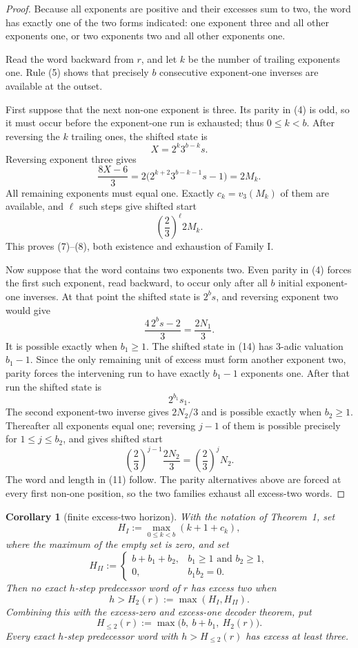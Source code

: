 \documentclass[11pt]{article}
\newtheorem{corollary}[theorem]{Corollary}
\begin{document}
\begin{proof}
Because all exponents are positive and their excesses sum to two, the
word has exactly one of the two forms indicated: one exponent three and
all other exponents one, or two exponents two and all other exponents
one.

Read the word backward from $r$, and let $k$ be the number of trailing
exponents one.  Rule (5) shows that precisely $b$ consecutive
exponent-one inverses are available at the outset.

First suppose that the next non-one exponent is three.  Its parity in
(4) is odd, so it must occur before the exponent-one run is exhausted;
thus $0\leq k<b$.  After reversing the $k$ trailing ones, the shifted
state is
\[
 X=2^k3^{b-k}s.
 \tag{12}
\]
Reversing exponent three gives
\[
 \frac{8X-6}{3}
 =2\bigl(2^{k+2}3^{b-k-1}s-1\bigr)
 =2M_k.
 \tag{13}
\]
All remaining exponents must equal one.  Exactly $c_k=v_3(M_k)$ of
them are available, and $\ell$ such steps give shifted start
\[
 \left(\frac23\right)^\ell2M_k.
\]
This proves (7)--(8), both existence and exhaustion of Family I.

Now suppose that the word contains two exponents two.  Even parity in
(4) forces the first such exponent, read backward, to occur only after
all $b$ initial exponent-one inverses.  At that point the shifted state
is $2^bs$, and reversing exponent two would give
\[
 \frac{4\,2^bs-2}{3}=\frac{2N_1}{3}.
 \tag{14}
\]
It is possible exactly when $b_1\geq1$.  The shifted state in (14) has
$3$-adic valuation $b_1-1$.  Since the only remaining unit of excess
must form another exponent two, parity forces the intervening run to
have exactly $b_1-1$ exponents one.  After that run the shifted state is
\[
 2^{b_1}s_1.
 \tag{15}
\]
The second exponent-two inverse gives $2N_2/3$ and is possible exactly
when $b_2\geq1$.  Thereafter all exponents equal one; reversing $j-1$
of them is possible precisely for $1\leq j\leq b_2$, and gives shifted
start
\[
 \left(\frac23\right)^{j-1}\frac{2N_2}{3}
 =\left(\frac23\right)^jN_2.
 \tag{16}
\]
The word and length in (11) follow.  The parity alternatives above are
forced at every first non-one position, so the two families exhaust all
excess-two words.
\end{proof}

\begin{corollary}[finite excess-two horizon]
With the notation of Theorem~1, set
\[
 H_I:=\max_{0\leq k<b}(k+1+c_k),
 \tag{17}
\]
where the maximum of the empty set is zero, and set
\[
 H_{II}:=
 \begin{cases}
 b+b_1+b_2,&b_1\geq1\text{ and }b_2\geq1,\\
 0,&b_1b_2=0.
 \end{cases}
 \tag{18}
\]
Then no exact $h$-step predecessor word of $r$ has excess two when
\[
 \boxed{h>H_2(r):=\max(H_I,H_{II}).}
 \tag{19}
\]
Combining this with the excess-zero and excess-one decoder theorem, put
\[
 H_{\leq2}(r):=\max\bigl(b,\ b+b_1,\ H_2(r)\bigr).
 \tag{20}
\]
Every exact $h$-step predecessor word with $h>H_{\leq2}(r)$ has excess
at least three.
\end{corollary}
\end{document}
